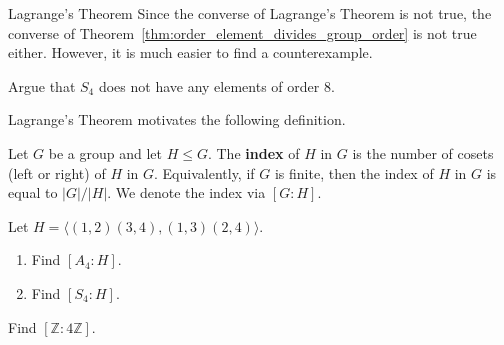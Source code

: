 \begin{section}{Lagrange's Theorem}
Since the converse of Lagrange's Theorem is not true, the converse of Theorem~\ref{thm:order_element_divides_group_order} is not true either.  However, it is much easier to find a counterexample.

\begin{problem}
Argue that $S_4$ does not have any elements of order 8.
\end{problem}

Lagrange's Theorem motivates the following definition.

\begin{definition}
Let $G$ be a group and let $H\leq G$.  The \textbf{index} of $H$ in $G$ is the number of cosets (left or right) of $H$ in $G$. Equivalently, if $G$ is finite, then the index of $H$ in $G$ is equal to $|G|/|H|$.  We denote the index via $[G:H]$.
\end{definition}

\begin{problem}
Let $H=\langle (1,2)(3,4),(1,3)(2,4)\rangle$.
\begin{enumerate}[label=\rm{(\alph*)}]
\item Find $[A_4:H]$.
\item Find $[S_4:H]$.
\end{enumerate}
\end{problem}

\begin{problem}
Find $[\mathbb{Z}:4\mathbb{Z}]$.
\end{problem}

\end{section}

